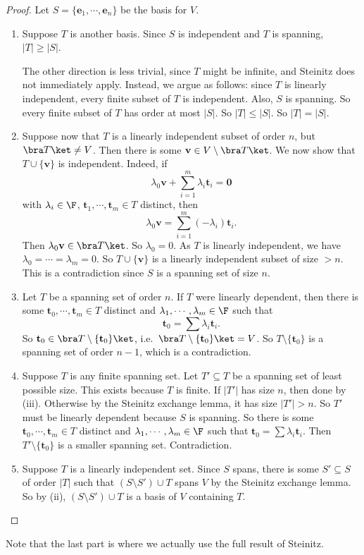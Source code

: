 \documentclass[a4paper]{article}
\begin{document}
\begin{proof}
  Let $S = \{\mathbf{e}_1, \cdots, \mathbf{e}_n\}$ be the basis for $V$.
  \begin{enumerate}
    \item Suppose $T$ is another basis. Since $S$ is independent and $T$ is spanning, $|T| \geq |S|$.

      The other direction is less trivial, since $T$ might be infinite, and Steinitz does not immediately apply. Instead, we argue as follows: since $T$ is linearly independent, every finite subset of $T$ is independent. Also, $S$ is spanning. So every finite subset of $T$ has order at most $|S|$. So $|T| \leq |S|$. So $|T| = |S|$.

    \item Suppose now that $T$ is a linearly independent subset of order $n$, but $\bra T\ket \not= V$. Then there is some $\mathbf{v} \in V\setminus \bra T\ket$. We now show that $T\cup \{\mathbf{v}\}$ is independent. Indeed, if
      \[
        \lambda_0 \mathbf{v} + \sum_{i = 1}^m \lambda_i \mathbf{t}_i = \mathbf{0}
      \]
      with $\lambda_i \in \F$, $\mathbf{t}_1, \cdots, \mathbf{t}_m\in T$ distinct, then
      \[
        \lambda_0 \mathbf{v} = \sum_{i = 1}^m (-\lambda_i) \mathbf{t}_i.
      \]
      Then $\lambda_0 \mathbf{v} \in \bra T\ket$. So $\lambda_0= 0$. As $T$ is linearly independent, we have $\lambda_0 = \cdots = \lambda_m = 0$. So $T\cup \{\mathbf{v}\}$ is a linearly independent subset of size $> n$. This is a contradiction since $S$ is a spanning set of size $n$.

    \item Let $T$ be a spanning set of order $n$. If $T$ were linearly dependent, then there is some $\mathbf{t}_0, \cdots, \mathbf{t}_m \in T$ distinct and $\lambda_1, \cdots, \lambda_m \in \F$ such that
      \[
        \mathbf{t}_0 = \sum \lambda_i \mathbf{t}_i.
      \]
      So $\mathbf{t}_0 \in \bra T\setminus \{\mathbf{t}_0\}\ket$, i.e.\ $\bra T\setminus \{\mathbf{t}_0\} \ket = V$. So $T\setminus \{\mathbf{t}_0\}$ is a spanning set of order $n - 1$, which is a contradiction.

    \item Suppose $T$ is any finite spanning set. Let $T' \subseteq T$ be a spanning set of least possible size. This exists because $T$ is finite. If $|T'|$ has size $n$, then done by (iii). Otherwise by the Steinitz exchange lemma, it has size $|T'| > n$. So $T'$ must be linearly dependent because $S$ is spanning. So there is some $\mathbf{t}_0, \cdots, \mathbf{t}_m \in T$ distinct and $\lambda_1, \cdots, \lambda_m \in \F$ such that $\mathbf{t}_0 = \sum \lambda_i \mathbf{t}_i$. Then $T'\setminus \{\mathbf{t}_0\}$ is a smaller spanning set. Contradiction.

    \item Suppose $T$ is a linearly independent set. Since $S$ spans, there is some $S' \subseteq S$ of order $|T|$ such that $(S\setminus S')\cup T$ spans $V$ by the Steinitz exchange lemma. So by (ii), $(S\setminus S')\cup T$ is a basis of $V$ containing $T$.\qedhere
  \end{enumerate}
\end{proof}
Note that the last part is where we actually use the full result of Steinitz.
\end{document}
